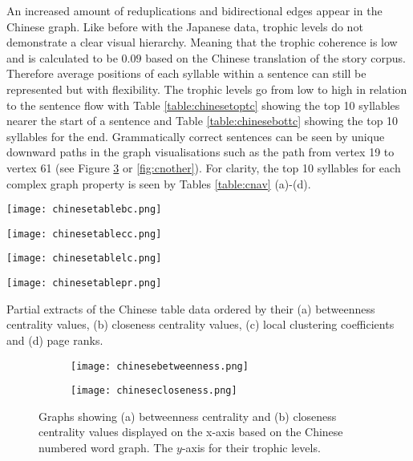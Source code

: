 An increased amount of reduplications and bidirectional edges appear in the Chinese graph. Like before with the Japanese data, trophic levels do not demonstrate a clear visual hierarchy. Meaning that the trophic coherence is low and is calculated to be $0.09$ based on the Chinese translation of the story corpus. Therefore average positions of each syllable within a sentence can still be represented but with flexibility. The trophic levels go from low to high in relation to the sentence flow with Table \ref{table:chinesetoptc} showing the top 10 syllables nearer the start of a sentence and Table \ref{table:chinesebottc} showing the top 10 syllables for the end. Grammatically correct sentences can be seen by unique downward paths in the graph visualisations such as the path from vertex 19 to vertex 61 (see Figure \ref{fig:cncentrality} or \ref{fig:cnother}). For clarity, the top 10 syllables for each complex graph property is seen by Tables \ref{table:cnav} (a)-(d).

\begin{table}[!htb]
\centering
\begin{subtable}{.2\textwidth}
	\centering
	\texttt{[image: chinesetablebc.png]}
	\caption{}
	\label{table:chinesetablebc}
\end{subtable}
\hfill
\begin{subtable}{.2\textwidth}
	\centering
	\texttt{[image: chinesetablecc.png]}
	\caption{}
	\label{table:chinesetablecc}
\end{subtable}
\hfill
\begin{subtable}{.2\textwidth}
	\centering
	\texttt{[image: chinesetablelc.png]}
	\caption{}
	\label{table:chinesetablelc}
\end{subtable}
\hfill
\begin{subtable}{.2\textwidth}
	\centering
	\texttt{[image: chinesetablepr.png]}
	\caption{}
	\label{table:chinesetablepr}
\end{subtable}
\caption{Partial extracts of the Chinese table data ordered by their (a) betweenness centrality values, (b) closeness centrality values, (c) local clustering coefficients and (d) page ranks.}
\label{table:cnav}
\end{table}

\begin{figure}[!htb]
\centering
\begin{subfigure}{.45\textwidth}
	\hspace{-1cm} 
	\texttt{[image: chinesebetweenness.png]}
	\caption{}
	\label{fig:cnbc}
\end{subfigure}
\hfill
\begin{subfigure}{.45\textwidth}
	\hspace{-1cm} 
	\texttt{[image: chinesecloseness.png]}
	\caption{ }
	\label{fig:cncc}
\end{subfigure}
\caption{Graphs showing (a) betweenness centrality and (b) closeness centrality values displayed on the x-axis based on the Chinese numbered word graph. The $y$-axis for their trophic levels.}
\label{fig:cncentrality}
\end{figure}

